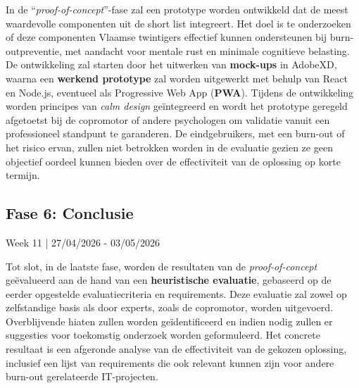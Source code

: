 \vspace{1em}

In de “\emph{proof-of-concept}”-fase zal een prototype worden ontwikkeld dat de meest waardevolle componenten uit de short list integreert. Het doel is te onderzoeken of deze componenten Vlaamse twintigers effectief kunnen ondersteunen bij burn-outpreventie, met aandacht voor mentale rust en minimale cognitieve belasting. De ontwikkeling zal starten door het uitwerken van \textbf{mock-ups} in AdobeXD, waarna een \textbf{werkend prototype} zal worden uitgewerkt met behulp van React en Node.js, eventueel als Progressive Web App (\textbf{PWA}). Tijdens de ontwikkeling worden principes van \emph{calm design} geïntegreerd en wordt het prototype geregeld afgetoetst bij de copromotor of andere psychologen om validatie vanuit een professioneel standpunt te garanderen. De eindgebruikers, met een burn-out of het risico ervan, zullen niet betrokken worden in de evaluatie gezien ze geen objectief oordeel kunnen bieden over de effectiviteit van de oplossing op korte termijn.

\vspace{1em}

\subsection{Fase 6: Conclusie}%
\label{subsec:conclusie}
Week 11 \hspace{1em}|\hspace{1em} 27/04/2026 - 03/05/2026

\vspace{1em}

Tot slot, in de laatste fase, worden de resultaten van de \emph{proof-of-concept} geëvalueerd aan de hand van een \textbf{heuristische evaluatie}, \newline gebaseerd op de eerder opgestelde evaluatiecriteria en requirements. Deze evaluatie zal zowel op zelfstandige basis als door experts, zoals de copromotor, worden uitgevoerd. Overblijvende hiaten zullen worden geïdentificeerd en indien nodig zullen er suggesties voor toekomstig onderzoek worden geformuleerd. Het concrete resultaat is een afgeronde analyse van de effectiviteit van de gekozen oplossing, inclusief een lijst van requirements die ook relevant kunnen zijn voor andere burn-out gerelateerde IT-projecten.


\vspace{1em}

